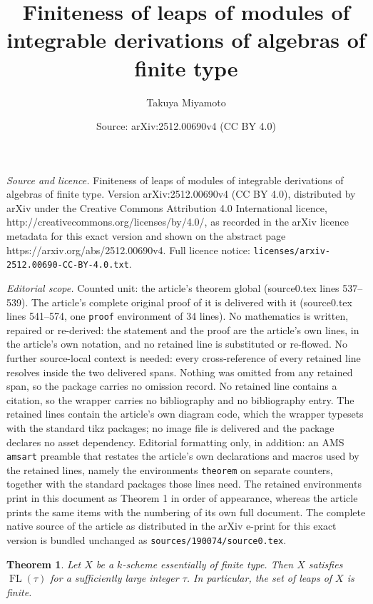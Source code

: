 \documentclass[10pt,a4paper]{amsart}
\title{Finiteness of leaps of modules of integrable derivations of algebras of finite type}
\author{Takuya Miyamoto}
\date{Source: arXiv:2512.00690v4 (CC BY 4.0)}
\newtheorem{theorem}{Theorem}
\newcommand{\FL}[1]{\operatorname{FL}(#1)}
\begin{document}
\maketitle

\noindent\emph{Source and licence.} Finiteness of leaps of modules of integrable derivations of algebras of finite type. Version arXiv:2512.00690v4 (CC BY 4.0), distributed by arXiv under the Creative Commons Attribution 4.0 International licence, http://creativecommons.org/licenses/by/4.0/, as recorded in the arXiv licence metadata for this exact version and shown on the abstract page https://arxiv.org/abs/2512.00690v4. Full licence notice: \texttt{licenses/arxiv-2512.00690-CC-BY-4.0.txt}.\par\smallskip

\noindent\textit{Editorial scope.} Counted unit: the article's theorem global (source0.tex lines 537--539). The article's complete original proof of it is delivered with it (source0.tex lines 541--574, one \texttt{proof} environment of 34 lines). No mathematics is written, repaired or re-derived: the statement and the proof are the article's own lines, in the article's own notation, and no retained line is substituted or re-flowed.  No further source-local context is needed: every cross-reference of every retained line resolves inside the two delivered spans.  Nothing was omitted from any retained span, so the package carries no omission record.  No retained line contains a citation, so the wrapper carries no bibliography and no bibliography entry.  The retained lines contain the article's own diagram code, which the wrapper typesets with the standard tikz packages; no image file is delivered and the package declares no asset dependency.  Editorial formatting only, in addition: an AMS \texttt{amsart} preamble that restates the article's own declarations and macros used by the retained lines, namely the environments \texttt{theorem} on separate counters, together with the standard packages those lines need.  The retained environments print in this document as Theorem 1 in order of appearance, whereas the article prints the same items with the numbering of its own full document.  The complete native source of the article as distributed in the arXiv e-print for this exact version is bundled unchanged as \texttt{sources/190074/source0.tex}.
\begin{theorem}\label{main thm global}
    Let $X$ be a $k$-scheme essentially of finite type. Then $X$ satisfies $\FL{\tau}$ for a sufficiently large integer $\tau$. In particular, the set of leaps of $X$ is finite.
\end{theorem}
\end{document}
